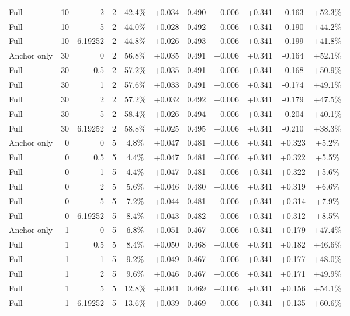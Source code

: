 \begin{table}[htbp]
\begin{tabular}{lrrrccccccc}
Full & 10 & 2 & 2 & 42.4\% & +0.034 & 0.490 & +0.006 & +0.341 & -0.163 & +52.3\% \\
Full & 10 & 5 & 2 & 44.0\% & +0.028 & 0.492 & +0.006 & +0.341 & -0.190 & +44.2\% \\
Full & 10 & 6.19252 & 2 & 44.8\% & +0.026 & 0.493 & +0.006 & +0.341 & -0.199 & +41.8\% \\
Anchor only & 30 & 0 & 2 & 56.8\% & +0.035 & 0.491 & +0.006 & +0.341 & -0.164 & +52.1\% \\
Full & 30 & 0.5 & 2 & 57.2\% & +0.035 & 0.491 & +0.006 & +0.341 & -0.168 & +50.9\% \\
Full & 30 & 1 & 2 & 57.6\% & +0.033 & 0.491 & +0.006 & +0.341 & -0.174 & +49.1\% \\
Full & 30 & 2 & 2 & 57.2\% & +0.032 & 0.492 & +0.006 & +0.341 & -0.179 & +47.5\% \\
Full & 30 & 5 & 2 & 58.4\% & +0.026 & 0.494 & +0.006 & +0.341 & -0.204 & +40.1\% \\
Full & 30 & 6.19252 & 2 & 58.8\% & +0.025 & 0.495 & +0.006 & +0.341 & -0.210 & +38.3\% \\
Anchor only & 0 & 0 & 5 & 4.8\% & +0.047 & 0.481 & +0.006 & +0.341 & +0.323 & +5.2\% \\
Full & 0 & 0.5 & 5 & 4.4\% & +0.047 & 0.481 & +0.006 & +0.341 & +0.322 & +5.5\% \\
Full & 0 & 1 & 5 & 4.4\% & +0.047 & 0.481 & +0.006 & +0.341 & +0.322 & +5.6\% \\
Full & 0 & 2 & 5 & 5.6\% & +0.046 & 0.480 & +0.006 & +0.341 & +0.319 & +6.6\% \\
Full & 0 & 5 & 5 & 7.2\% & +0.044 & 0.481 & +0.006 & +0.341 & +0.314 & +7.9\% \\
Full & 0 & 6.19252 & 5 & 8.4\% & +0.043 & 0.482 & +0.006 & +0.341 & +0.312 & +8.5\% \\
Anchor only & 1 & 0 & 5 & 6.8\% & +0.051 & 0.467 & +0.006 & +0.341 & +0.179 & +47.4\% \\
Full & 1 & 0.5 & 5 & 8.4\% & +0.050 & 0.468 & +0.006 & +0.341 & +0.182 & +46.6\% \\
Full & 1 & 1 & 5 & 9.2\% & +0.049 & 0.467 & +0.006 & +0.341 & +0.177 & +48.0\% \\
Full & 1 & 2 & 5 & 9.6\% & +0.046 & 0.467 & +0.006 & +0.341 & +0.171 & +49.9\% \\
Full & 1 & 5 & 5 & 12.8\% & +0.041 & 0.469 & +0.006 & +0.341 & +0.156 & +54.1\% \\
Full & 1 & 6.19252 & 5 & 13.6\% & +0.039 & 0.469 & +0.006 & +0.341 & +0.135 & +60.6\% \\

\end{tabular}
\end{table}

